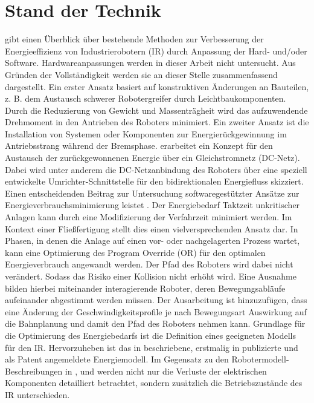 \section{Stand der Technik}
\cite{Carabin.2017} gibt einen Überblick über bestehende Methoden zur Verbesserung der Energieeffizienz von Industrierobotern (IR) durch Anpassung der Hard- und/oder Software. Hardwareanpassungen werden in dieser Arbeit nicht untersucht. Aus Gründen der Vollständigkeit werden sie an dieser Stelle zusammenfassend dargestellt. Ein erster Ansatz basiert auf konstruktiven Änderungen an Bauteilen, z. B. dem Austausch schwerer Robotergreifer durch Leichtbaukomponenten. Durch die Reduzierung von Gewicht und Massenträgheit wird das aufzuwendende Drehmoment in den Antrieben des Roboters minimiert. Ein zweiter Ansatz ist die Installation von Systemen oder Komponenten zur Energierückgewinnung im Antriebsstrang während der Bremsphase. \cite{Pellicciari.2015} erarbeitet ein Konzept für den Austausch der zurückgewonnenen Energie über ein Gleichstromnetz (DC-Netz). Dabei wird unter anderem die DC-Netzanbindung des Roboters über eine speziell entwickelte Umrichter-Schnittstelle für den bidirektionalen Energiefluss skizziert.
Einen entscheidenden Beitrag zur Untersuchung softwaregestützter Ansätze zur Energieverbrauchsminimierung leistet \cite{Eggers.2019}.
Der Energiebedarf Taktzeit unkritischer Anlagen kann durch eine Modifizierung der Verfahrzeit minimiert werden. Im Kontext einer Fließfertigung stellt dies einen vielversprechenden Ansatz dar. In Phasen, in denen die Anlage auf einen vor- oder nachgelagerten Prozess wartet, kann eine Optimierung des Program Override (OR) für den optimalen Energieverbrauch angewandt werden. Der Pfad des Roboters wird dabei nicht verändert. Sodass das Risiko einer Kollision nicht erhöht wird. Eine Ausnahme bilden hierbei miteinander interagierende Roboter, deren Bewegungsabläufe aufeinander abgestimmt werden müssen. Der Ausarbeitung \cite{Eggers.2019} ist hinzuzufügen, dass eine Änderung der Geschwindigkeitsprofile je nach Bewegungsart Auswirkung auf die Bahnplanung und damit den Pfad des Roboters nehmen kann. 
%
%
Grundlage für die Optimierung des Energiebedarfs ist die Definition eines geeigneten Modells für den IR. 
Hervorzuheben ist das in \cite{Eggers.2019} beschriebene, erstmalig in \cite{Ziaukas.2017} publizierte und als Patent  \cite{Patent.2016} angemeldete Energiemodell. Im Gegensatz zu den Robotermodell-Beschreibungen in \cite{Pellicciari.2011}, \cite{Sergaki.2002} und \cite{Paryanto.2015} werden nicht nur die Verluste der elektrischen Komponenten detailliert betrachtet, sondern zusätzlich die Betriebszustände des IR unterschieden. 
